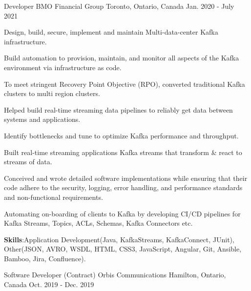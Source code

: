 \begin{cventries}
{\begin{cvitems}
      \end{cvitems}
    }
    \vspace{5mm} %
  \cventry
    {Developer} %
    {BMO Financial Group} %
    {Toronto, Ontario, Canada} %
    {Jan. 2020 - July 2021} %
    {
      \begin{cvitems} %
        \item {Design, build, secure, implement and maintain Multi-data-center Kafka infrastructure.}
        \item {Build automation to provision, maintain, and monitor all aspects of the Kafka environment via infrastructure as code.}
        \item To meet stringent Recovery Point Objective (RPO), converted traditional Kafka clusters to multi region clusters. 
        \item {Helped build real-time streaming data pipelines to reliably get data between systems and applications.}
        \item {Identify bottlenecks and tune to optimize Kafka performance and throughput.}
        \item {Built real-time streaming applications Kafka streams that transform \& react to streams of data.}
        \item {Conceived and wrote detailed software implementations while ensuring that their code adhere to the security, logging, error handling, and performance standards and non-functional requirements.}
        \item {Automating on-boarding of clients to Kafka by developing CI/CD pipelines for Kafka Streams, Topics, ACLs, Schemas, Kafka Connectors etc.}
         \vspace{1mm} %
        \item {\textbf{Skills}:Application Development(Java, KafkaStreams, KafkaConnect, JUnit), Other(JSON, AVRO, WSDL, HTML, CSS3, JavaScript, Angular, Git, Ansible, Bamboo, Jira, Confluence).}
      \end{cvitems}
    }
    \vspace{5mm} %
  \cventry
    {Software Developer (Contract)} %
    {Orbis Communications} %
    {Hamilton, Ontario, Canada} %
    {Oct. 2019 - Dec. 2019} %
    {
      \begin{cvitems} %

\end{cvitems}}
\end{cventries}
